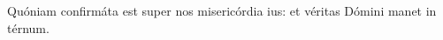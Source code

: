 \item {}

\item Quóniam confirmáta est super nos misericórdia ius:\psstar{} et véritas Dómini manet in térnum.